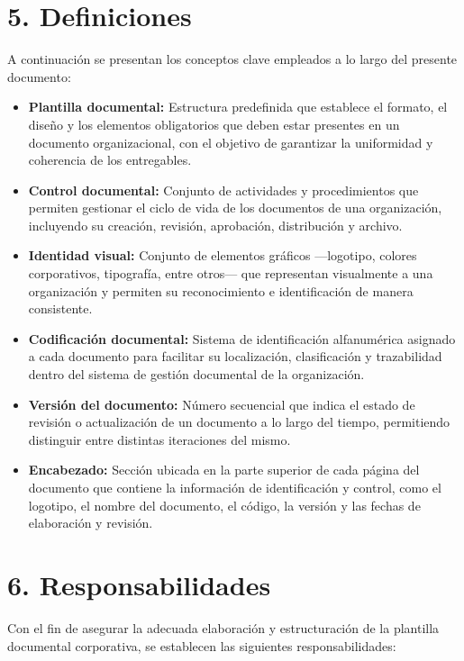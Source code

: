 \documentclass{encabezado}
\begin{document}
\section*{5. Definiciones}

A continuación se presentan los conceptos clave empleados a lo largo del presente documento:

\begin{itemize}
    \item \textbf{Plantilla documental:} Estructura predefinida que establece el formato, el diseño y los elementos obligatorios que deben estar presentes en un documento organizacional, con el objetivo de garantizar la uniformidad y coherencia de los entregables.
    \item \textbf{Control documental:} Conjunto de actividades y procedimientos que permiten gestionar el ciclo de vida de los documentos de una organización, incluyendo su creación, revisión, aprobación, distribución y archivo.
    \item \textbf{Identidad visual:} Conjunto de elementos gráficos —logotipo, colores corporativos, tipografía, entre otros— que representan visualmente a una organización y permiten su reconocimiento e identificación de manera consistente.
    \item \textbf{Codificación documental:} Sistema de identificación alfanumérica asignado a cada documento para facilitar su localización, clasificación y trazabilidad dentro del sistema de gestión documental de la organización.
    \item \textbf{Versión del documento:} Número secuencial que indica el estado de revisión o actualización de un documento a lo largo del tiempo, permitiendo distinguir entre distintas iteraciones del mismo.
    \item \textbf{Encabezado:} Sección ubicada en la parte superior de cada página del documento que contiene la información de identificación y control, como el logotipo, el nombre del documento, el código, la versión y las fechas de elaboración y revisión.
\end{itemize}

\section*{6. Responsabilidades}

Con el fin de asegurar la adecuada elaboración y estructuración de la plantilla documental corporativa, se establecen las siguientes responsabilidades:
\end{document}
